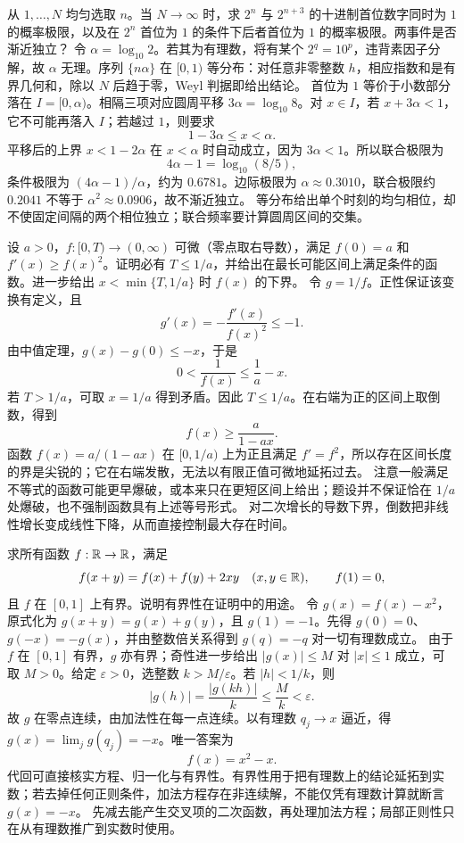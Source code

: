 从 $1,\ldots,N$ 均匀选取 $n$。当 $N\to\infty$ 时，求 $2^n$ 与 $2^{n+3}$ 的十进制首位数字同时为 $1$ 的概率极限，以及在 $2^n$ 首位为 $1$ 的条件下后者首位为 $1$ 的概率极限。两事件是否渐近独立？
\solution 令 $\alpha=\log_{10}2$。若其为有理数，将有某个 $2^q=10^p$，违背素因子分解，故 $\alpha$ 无理。序列 $\{n\alpha\}$ 在 $[0,1)$ 等分布：对任意非零整数 $h$，相应指数和是有界几何和，除以 $N$ 后趋于零，Weyl 判据即给出结论。
首位为 $1$ 等价于小数部分落在 $I=[0,\alpha)$。相隔三项对应圆周平移 $3\alpha=\log_{10}8$。对 $x\in I$，若 $x+3\alpha<1$，它不可能再落入 $I$；若越过 $1$，则要求
\[
 1-3\alpha\le x<\alpha.
\]
平移后的上界 $x<1-2\alpha$ 在 $x<\alpha$ 时自动成立，因为 $3\alpha<1$。所以联合极限为
\[
 4\alpha-1=\log_{10}(8/5),
\]
条件极限为 $(4\alpha-1)/\alpha$，约为 $0.6781$。边际极限为 $\alpha\approx0.3010$，联合极限约 $0.2041$ 不等于 $\alpha^2\approx0.0906$，故不渐近独立。
\insight 等分布给出单个时刻的均匀相位，却不使固定间隔的两个相位独立；联合频率要计算圆周区间的交集。

设 $a>0$，$f:[0,T)\to(0,\infty)$ 可微（零点取右导数），满足 $f(0)=a$ 和 $f'(x)\ge f(x)^2$。证明必有 $T\le1/a$，并给出在最长可能区间上满足条件的函数。进一步给出 $x<\min\{T,1/a\}$ 时 $f(x)$ 的下界。
\solution 令 $g=1/f$。正性保证该变换有定义，且
\[
 g'(x)=-\frac{f'(x)}{f(x)^2}\le-1.
\]
由中值定理，$g(x)-g(0)\le-x$，于是
\[
 0<\frac1{f(x)}\le\frac1a-x.
\]
若 $T>1/a$，可取 $x=1/a$ 得到矛盾。因此 $T\le1/a$。在右端为正的区间上取倒数，得到
\[
 f(x)\ge\frac{a}{1-ax}.
\]
函数 $f(x)=a/(1-ax)$ 在 $[0,1/a)$ 上为正且满足 $f'=f^2$，所以存在区间长度的界是尖锐的；它在右端发散，无法以有限正值可微地延拓过去。
注意一般满足不等式的函数可能更早爆破，或本来只在更短区间上给出；题设并不保证恰在 $1/a$ 处爆破，也不强制函数具有上述等号形式。
\insight 对二次增长的导数下界，倒数把非线性增长变成线性下降，从而直接控制最大存在时间。

求所有函数 $f:\mathbb{R}\to\mathbb{R}$，满足
\[
 f(x+y)=f(x)+f(y)+2xy\quad(x,y\in\mathbb{R}),
 \qquad f(1)=0,
\]
且 $f$ 在 $[0,1]$ 上有界。说明有界性在证明中的用途。
\solution 令 $g(x)=f(x)-x^2$，原式化为 $g(x+y)=g(x)+g(y)$，且 $g(1)=-1$。先得 $g(0)=0$、$g(-x)=-g(x)$，并由整数倍关系得到 $g(q)=-q$ 对一切有理数成立。
由于 $f$ 在 $[0,1]$ 有界，$g$ 亦有界；奇性进一步给出 $|g(x)|\le M$ 对 $|x|\le1$ 成立，可取 $M>0$。给定 $\varepsilon>0$，选整数 $k>M/\varepsilon$。若 $|h|<1/k$，则
\[
 |g(h)|=\frac{|g(kh)|}{k}\le\frac Mk<\varepsilon.
\]
故 $g$ 在零点连续，由加法性在每一点连续。以有理数 $q_j\to x$ 逼近，得 $g(x)=\lim_jg(q_j)=-x$。唯一答案为
\[
 \boxed{f(x)=x^2-x}.
\]
代回可直接核实方程、归一化与有界性。有界性用于把有理数上的结论延拓到实数；若去掉任何正则条件，加法方程存在非连续解，不能仅凭有理数计算就断言 $g(x)=-x$。
\insight 先减去能产生交叉项的二次函数，再处理加法方程；局部正则性只在从有理数推广到实数时使用。

